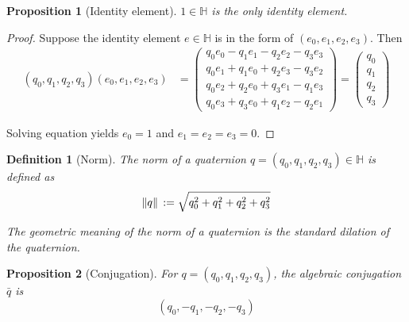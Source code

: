 \documentclass[12pt]{article}
\newtheorem*{definition}{Definition}
\newtheorem*{proposition}{Proposition}
\begin{document}
    \begin{proposition}[Identity element]
        $1\in\mathbb{H}$ is the only identity element.
    \end{proposition}

    \begin{proof}
        Suppose the identity element $e\in\mathbb{H}$ is in the form of $(e_0,e_1,e_2,e_3)$. Then \begin{align*}
            (q_0,q_1,q_2,q_3)(e_0,e_1,e_2,e_3)&=\begin{pmatrix}
                q_0e_0-q_1e_1-q_2e_2-q_3e_3\\
                q_0e_1+q_1e_0+q_2e_3-q_3e_2\\
                q_0e_2+q_2e_0+q_3e_1-q_1e_3\\
                q_0e_3+q_3e_0+q_1e_2-q_2e_1
            \end{pmatrix}
            =\begin{pmatrix}
                q_0\\q_1\\q_2\\q_3
            \end{pmatrix}
        \end{align*}

        Solving equation yields $e_0=1$ and $e_1=e_2=e_3=0$.
    \end{proof}

    \begin{definition}[Norm]
        The norm of a quaternion $q=(q_0,q_1,q_2,q_3)\in\mathbb{H}$ is defined as $$\norm*{q}:=\sqrt{q_0^2+q_1^2+q_2^2+q_3^2}$$

        The geometric meaning of the norm of a quaternion is the standard dilation of the quaternion.
    \end{definition}

    \begin{proposition}[Conjugation]
        For $q=(q_0,q_1,q_2,q_3)$, the algebraic conjugation $\bar{q}$ is $$(q_0,-q_1,-q_2,-q_3)$$
    \end{proposition}
\end{document}
